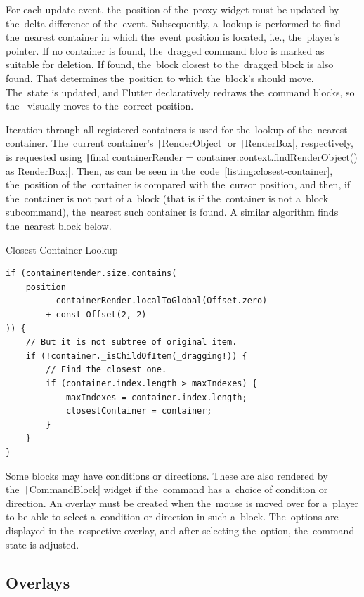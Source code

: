 For each update event, the~position of the~proxy widget must be updated by the~delta difference of the~event.
Subsequently, a~lookup is performed to find the~nearest container in which the~event position is located, i.e., the~player's pointer.
If no container is found, the~dragged command bloc is marked as suitable for deletion.
If found, the~block closest to the~dragged block is also found.
That determines the~position to which the~block's  should move.
The~state is updated, and Flutter declaratively redraws the~command blocks, so the~ visually moves to the~correct position.

Iteration through all registered containers is used for the~lookup of the~nearest container.
The~current container's \texttt|RenderObject| or \texttt|RenderBox|, respectively, is requested using \texttt|final containerRender = container.context.findRenderObject() as RenderBox;|.
Then, as can be seen in the~code~\ref{listing:closest-container}, the~position of the~container is compared with the~cursor position, and then, if the~container is not part of a~block (that is if the~container is not a~block subcommand), the~nearest such container is found.
A similar algorithm finds the~nearest block below.

\begin{listing}
    \caption{Closest Container Lookup}
    \label{listing:closest-container}
    \begin{verbatim}
if (containerRender.size.contains(
    position 
        - containerRender.localToGlobal(Offset.zero) 
        + const Offset(2, 2)
)) {
    // But it is not subtree of original item.
    if (!container._isChildOfItem(_dragging!)) {
        // Find the closest one.
        if (container.index.length > maxIndexes) {
            maxIndexes = container.index.length;
            closestContainer = container;
        }
    }
}
    \end{verbatim}
\end{listing}

Some blocks may have conditions or directions.
These are also rendered by the~\texttt|CommandBlock| widget if the~command has a~choice of condition or direction.
An overlay must be created when the~mouse is moved over for a~player to be able to select a~condition or direction in such a~block.
The~options are displayed in the~respective overlay, and after selecting the~option, the~command state is adjusted.

\subsection{Overlays}

